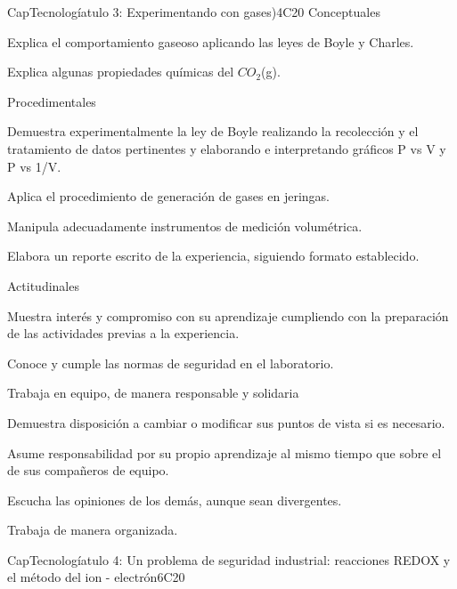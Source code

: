 \begin{syllabus}
\begin{unit}{CapTecnologíatulo 3: Experimentando con gases)}{}{}{4}{C20}
Conceptuales

\begin{topics}
      \item Explica el comportamiento gaseoso aplicando las leyes de Boyle y Charles.
      \item Explica algunas propiedades químicas del $CO_2$(g).
   \end{topics}
   
   Procedimentales

\begin{topics}
      \item Demuestra experimentalmente la ley de Boyle realizando la recolección y el tratamiento de datos pertinentes y elaborando e interpretando gráficos P vs V y P vs 1/V.
      \item Aplica el procedimiento de generación de gases en jeringas.
      \item Manipula adecuadamente instrumentos de medición volumétrica. 
      \item Elabora un reporte escrito de la experiencia, siguiendo formato establecido.
   \end{topics}
   
   Actitudinales

\begin{topics}
      \item Muestra interés y compromiso con su aprendizaje cumpliendo con la preparación de las actividades previas a la experiencia.
      \item Conoce y cumple las normas de seguridad en el laboratorio.
      \item Trabaja en equipo, de manera responsable y solidaria
      \item Demuestra disposición a cambiar o modificar sus puntos de vista si es necesario.
     \item Asume responsabilidad por su propio aprendizaje al mismo tiempo que sobre el de sus compañeros de equipo.
      \item Escucha las opiniones de los demás, aunque sean divergentes.
     \item Trabaja de manera organizada.
   \end{topics}

   \begin{learningoutcomes}
      \item 
   \end{learningoutcomes}
\end{unit}

\begin{unit}{CapTecnologíatulo 4: Un problema de seguridad industrial: reacciones REDOX y el método del ion - electrón}{}{}{6}{C20}


\end{unit}
\end{syllabus}
